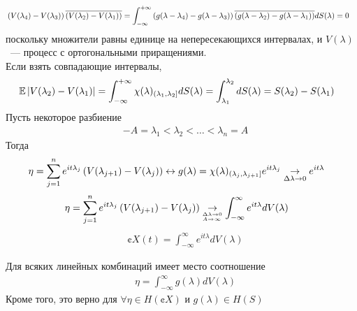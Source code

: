 \begin{Proof}
    \begin{align*}
      & \left( V(\lambda_4) - V(\lambda_3)\right)\overline{\left( V(\lambda_2) - V(\lambda_1) \right)} = \int_{-\infty}^{+\infty}\left( g(\lambda-\lambda_4) - g(\lambda-\lambda_3) \right)\overline{\left( g(\lambda-\lambda_2) - g(\lambda-\lambda_1) \right)}dS(\lambda) = 0
    \end{align*}
    поскольку множители равны единице на непересекающихся интервалах, и
    $V(\lambda)$~--- процесс с ортогональными приращениями.
    \\
    Если взять совпадающие интервалы,
    \begin{align*}
      & \mathbb{E} \left| V(\lambda_2) - V(\lambda_1)\right|= \int_{-\infty}^{+\infty}\chi(\lambda)_{(\lambda_1, \lambda_2]}dS(\lambda) = \int_{\lambda_1}^{\lambda_2}dS(\lambda) = S(\lambda_2) - S(\lambda_1)
    \end{align*}
    Пусть некоторое разбиение
    \begin{align*}
      & -A = \lambda_1 < \lambda_2 < \dots < \lambda_n = A
    \end{align*}
    Тогда
    \begin{align*}
      & \eta = \sum_{j=1}^n e^{it\lambda_j}\left( V(\lambda_{j+1}) - V(\lambda_j) \right) \leftrightarrow g(\lambda) = \chi(\lambda)_{(\lambda_j, \lambda_{j+1}]}e^{it\lambda_j} \underset{\Delta \lambda \to 0}\rightarrow e^{it\lambda} 
    \end{align*}
    \begin{align*}
      & \eta = \sum_{j=1}^n e^{it\lambda_j}\left( V(\lambda_{j+1}) - V(\lambda_j) \right) \underset{^{\Delta \lambda \to 0}_{A \to \infty}}\rightarrow \int_{-\infty}^{\infty}e^{it\lambda}dV(\lambda)
    \end{align*}
    \begin{align*}
      & \cent{X}(t) = \int_{-\infty}^{\infty}e^{it\lambda}dV(\lambda)
    \end{align*}  
\end{Proof}
\begin{Note}
    Для всяких линейных комбинаций имеет место соотношение
    \begin{align*}
      & \eta = \int_{-\infty}^{\infty}g(\lambda)dV(\lambda)
    \end{align*}
    Кроме того, это верно для $\forall \eta \in H\left( \cent{X} \right)$ и
    $g(\lambda)\in H(S)$
\end{Note}
